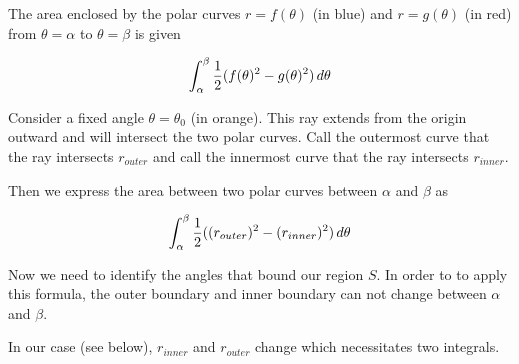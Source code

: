 \documentclass{ximera}
\begin{document}
\begin{exercise}
\begin{exercise}
\begin{hint}
\begin{image}
\end{image}


The area enclosed by the polar curves $r=f(\theta)$ (in blue) and $r=g(\theta)$ (in red) from $\theta=\alpha$ to $\theta=\beta$ is given 

\[
\int_{\alpha}^{\beta} \frac{1}{2} (f(\theta)^2 -g(\theta)^2) \mathop{}\!d \theta
\]

Consider a fixed angle $\theta=\theta_{0}$ (in orange). This ray extends from the origin outward and will intersect the two polar curves. Call the outermost curve that the ray intersects
$r_{outer}$ and call the innermost curve that the ray intersects $r_{inner}$. 

Then we express the area between two polar curves between $\alpha$ and $\beta$ as 

\[
\int_{\alpha}^{\beta} \frac{1}{2}( (r_{outer})^2 -(r_{inner})^2) \mathop{}\!d \theta
\]

Now we need to identify the angles that bound our region $S$. In order to to apply this formula, the outer boundary and inner boundary can not change between $\alpha$ and $\beta$. 


In our case (see below), $r_{inner}$ and $r_{outer}$ change which necessitates two integrals. 



\end{hint}
\end{exercise}
\end{exercise}
\end{document}
